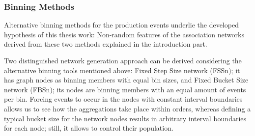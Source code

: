 \subsubsection*{Binning Methods}
%

Alternative binning methods for the production events underlie the developed hypothesis of this thesis work: Non-random features of the association networks derived from these two methods explained in the introduction part.

Two distinguished network generation approach can be derived considering the alternative binning tools mentioned above: Fixed Step Size network (FSSn); it has graph nodes as binning members with equal bin sizes, and Fixed Bucket Size network (FBSn); its nodes are binning members with an equal amount of events per bin. Forcing events to occur in the nodes with constant interval boundaries allows us to see how the aggregations take place within orders, whereas defining a typical bucket size for the network nodes results in arbitrary interval boundaries for each node; still, it allows to control their population.



\clearpage

